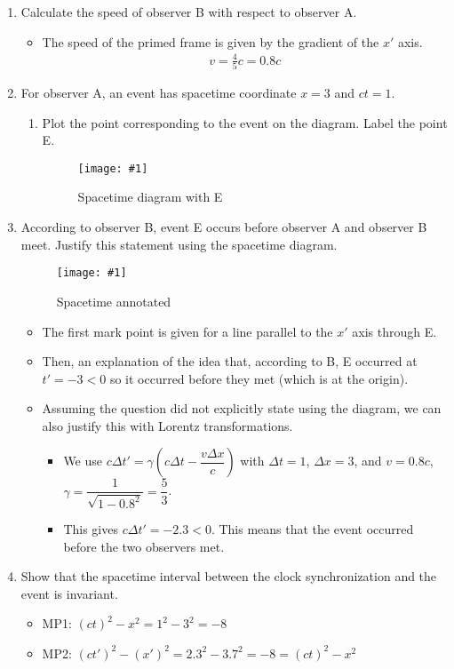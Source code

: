 \documentclass[a4paper,12pt]{article}
\newcommand{\img}[4]{\begin{center}
  \begin{figure}[H]
    \centering
    \texttt{[image: \#1]}
    \caption{#3}
    \label{fig:#4}
  \end{figure}
\end{center}}
\newcommand{\paren}[1]{\left(#1\right)}
\begin{document}
\begin{enumerate}[label=(\alph*)]
  \item Calculate the speed of observer B with respect to observer A.
        \begin{itemize}
          \item The speed of the primed frame is given by the gradient of the $x'$ axis.
                \begin{align*}
                  v = \frac{4}{5}c = 0.8c
                \end{align*}
        \end{itemize}
  \item For observer A, an event has spacetime coordinate $x = 3$ and $ct = 1$.
        \begin{enumerate}[label=(\roman*)]
          \item Plot the point corresponding to the event on the diagram. Label the point E.
                \img{ex/2.png}{0.95}{Spacetime diagram with E}{misc2}
        \end{enumerate}
  \item According to observer B, event E occurs before observer A and observer B meet. Justify this statement using the spacetime diagram.
        \img{ex/3.png}{0.95}{Spacetime annotated}{misc3}
        \begin{itemize}
          \item The first mark point is given for a line parallel to the $x'$ axis through E.
          \item Then, an explanation of the idea that, according to B, E occurred at $t' = -3 < 0$ so it occurred before they met (which is at the origin).
          \item Assuming the question did not explicitly state using the diagram, we can also justify this with Lorentz transformations.
                \begin{itemize}
                  \item We use $c\Delta t' = \gamma\paren{c\Delta t - \dfrac{v\Delta x}{c}}$ with $\Delta t = 1$, $\Delta x = 3$, and $v = 0.8c$, $\gamma = \dfrac{1}{\sqrt{1 - 0.8^2}} = \dfrac{5}{3}$.
                  \item This gives $c\Delta t' = -2.3 < 0$. This means that the event occurred before the two observers met.
                \end{itemize}
        \end{itemize}
  \item Show that the spacetime interval between the clock synchronization and the event is invariant.
        \begin{itemize}
          \item MP1: $(ct)^2 - x^2 = 1^2 - 3^2 = -8$
          \item MP2: $(ct')^2 - (x')^2 = 2.3^2 - 3.7^2 = -8 = (ct)^2 - x^2$
        \end{itemize}
\end{enumerate}
\end{document}
